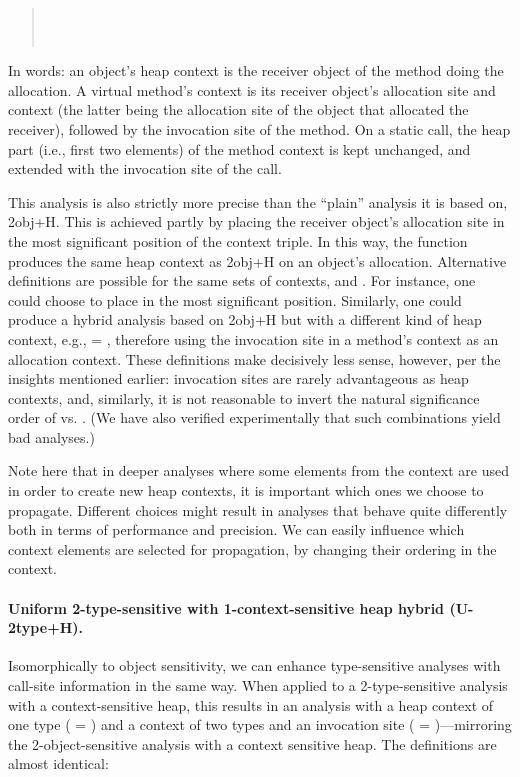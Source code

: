 \begin{quote}
 \\
 \\
\end{quote}

In words: an object's heap context is the receiver object of the method doing the allocation. A virtual method's context is its receiver object's allocation site and context (the latter being the allocation site of the object that allocated the receiver), followed by the invocation site of the method. On a static call, the heap part (i.e., first two elements) of the method context is kept unchanged, and extended with the invocation site of the call.

This analysis is also strictly more precise than the ``plain'' analysis it is based on, 2obj+H. This is achieved partly by placing the receiver object's allocation site in the most significant position of the context triple. In this way, the  function produces the same heap context as 2obj+H on an object's allocation. Alternative definitions are possible for the same sets of contexts,  and . For instance, one could choose to place  in the most significant position. Similarly, one could produce a hybrid analysis based on 2obj+H but with a different kind of heap context, e.g.,  = , therefore using the invocation site in a method's context as an allocation context. These definitions make decisively less sense, however, per the insights mentioned earlier: invocation sites are rarely advantageous as heap contexts, and, similarly, it is not reasonable to invert the natural significance order of  vs. . (We have also verified experimentally that such combinations yield bad analyses.)

Note here that in deeper analyses where some elements from the context are used in order to create new heap contexts, it is important which ones we choose to propagate. Different choices might result in analyses that behave quite differently both in terms of performance and precision. We can easily influence which context elements are selected for propagation, by changing their ordering in the context.

\paragraph[Uniform 2-type-sensitive with 1-context-sensitive heap]{Uniform 2-type-sensitive with 1-context-sensitive heap hybrid (U-2type+H).}
Isomorphically to object sensitivity, we can enhance type-sensitive analyses with call-site information in the same way. When applied to a 2-type-sensitive analysis with a context-sensitive heap, this results in an analysis with a heap context of one type ( = ) and a context of two types and an invocation site ( = )---mirroring the 2-object-sensitive analysis with a context sensitive heap. The definitions are almost identical:

